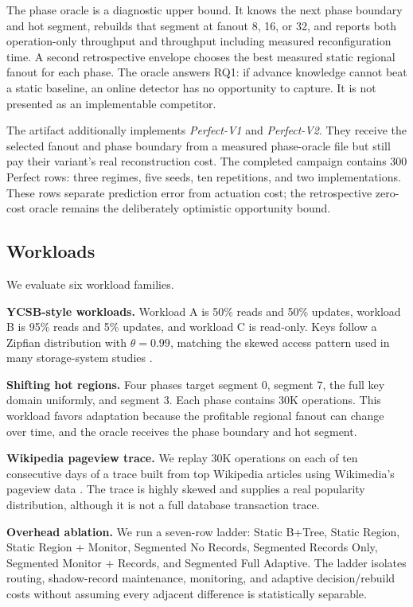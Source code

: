 \documentclass[sigconf,review,anonymous]{acmart}
\begin{document}
The phase oracle is a diagnostic upper bound.  It knows the next phase boundary
and hot segment, rebuilds that segment at fanout 8, 16, or 32, and reports both
operation-only throughput and throughput including measured reconfiguration
time.  A second retrospective envelope chooses the best measured static
regional fanout for each phase.  The oracle answers RQ1: if advance knowledge
cannot beat a static baseline, an online detector has no opportunity to
capture.  It is not presented as an implementable competitor.

The artifact additionally implements \emph{Perfect-V1} and \emph{Perfect-V2}.
They receive the selected fanout and phase boundary from a measured
phase-oracle file but still pay their variant's real reconstruction cost.  The
completed campaign contains 300 Perfect rows: three regimes, five seeds, ten
repetitions, and two implementations.  These rows separate prediction error
from actuation cost; the retrospective zero-cost oracle remains the deliberately
optimistic opportunity bound.

\subsection{Workloads}

We evaluate six workload families.

\textbf{YCSB-style workloads.}  Workload A is 50\% reads and 50\% updates,
workload B is 95\% reads and 5\% updates, and workload C is read-only.  Keys
follow a Zipfian distribution with \(\theta=0.99\), matching the skewed access
pattern used in many storage-system studies \cite{cooper2010benchmarking}.

\textbf{Shifting hot regions.}  Four phases target segment 0, segment 7, the
full key domain uniformly, and segment 3.  Each phase contains 30K operations.
This workload favors adaptation because the profitable regional fanout can
change over time, and the oracle receives the phase boundary and hot segment.

\textbf{Wikipedia pageview trace.}  We replay 30K operations on each of ten
consecutive days of a trace built from top Wikipedia articles using
Wikimedia's pageview data \cite{wikimediaPageviews}.  The trace is highly
skewed and supplies a real popularity distribution, although it is not a full
database transaction trace.

\textbf{Overhead ablation.}  We run a seven-row ladder: Static B+Tree, Static
Region, Static Region + Monitor, Segmented No Records, Segmented Records Only,
Segmented Monitor + Records, and Segmented Full Adaptive.  The ladder isolates
routing, shadow-record maintenance, monitoring, and adaptive decision/rebuild
costs without assuming every adjacent difference is statistically separable.
\end{document}
